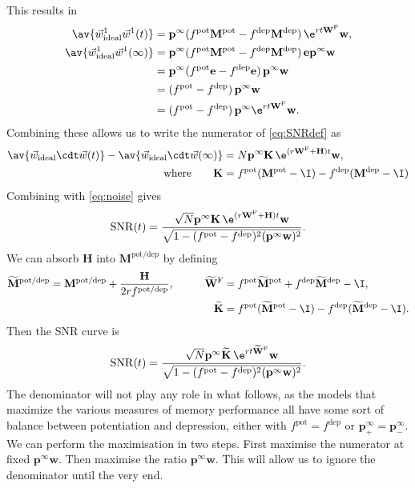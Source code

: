 \documentclass[12pt]{article}
\newcommand{\onev}{\mathbf{e}}
\newcommand{\pr}{\mathbf{p}}
\newcommand{\eq}{\pr^\infty}
\newcommand{\w}{\mathbf{w}}
\newcommand{\W}{\mathbf{W}}
\newcommand{\M}{\mathbf{M}}
\newcommand{\enc}{\mathbf{K}}
\newcommand{\frg}{\W^{\mathrm{F}}}
\newcommand{\pot}{^{\text{pot}}}
\newcommand{\dep}{^{\text{dep}}}
\newcommand{\potdep}{^{\text{pot/dep}}}
\renewcommand{\hom}{\mathbf{H}}
\newcommand{\Mh}{\widetilde{\M}}
\newcommand{\frgh}{\widetilde{\W}^{\mathrm{F}}}
\newcommand{\ench}{\widetilde{\enc}}
\newcommand{\syn}{\vec{w}}
\DeclareMathOperator{\SNR}{SNR}
\begin{document}
This results in
%
\begin{equation}\label{eq:overlapwt}
\begin{aligned}
  \av{\syn^1_\text{ideal}\syn^1(t)} &= \eq (f\pot\M\pot-f\dep\M\dep)\, \e^{rt\frg} \w, \\
  \av{\syn^1_\text{ideal}\syn^1(\infty)} &= \eq (f\pot\M\pot-f\dep\M\dep)\, \onev\eq \w \\
         &= \eq (f\pot\onev-f\dep\onev)\, \eq \w \\
         &=  (f\pot-f\dep)\, \eq \w \\
         &=  (f\pot-f\dep)\, \eq \e^{rt\frg} \w .
\end{aligned}
\end{equation}
%
Combining these allows us to write the numerator of \eqref{eq:SNRdef} as
%
\begin{equation}\label{eq:signal}
\begin{aligned}
  \av{\syn_\text{ideal}\cdt\syn(t)} - \av{\syn_\text{ideal}\cdt\syn(\infty)}
    &= N \eq \enc \, \e^{(r\frg+\hom)t} \w , \\
    \text{where} \qquad
  \enc &= f\pot(\M\pot-\I)-f\dep(\M\dep-\I)
\end{aligned}
\end{equation}
%
Combining with \eqref{eq:noise} gives
%
\begin{equation}\label{eq:SNRcurveExact}
  \SNR(t) = \frac{\sqrt{N} \eq \enc\,\e^{(r\frg+\hom)t}\w}
                 {\sqrt{1-(f\pot-f\dep)^2(\eq\w)^2}}.
\end{equation}
%
We can absorb $\hom$ into $\M\potdep$ by defining
%
\begin{equation}\label{eq:absorbhom}
\begin{aligned}
  \Mh\potdep &= \M\potdep + \frac{\hom}{2rf\potdep},
  &\qquad
  \frgh &= f\pot\Mh\pot + f\dep\Mh\dep - \I,
  \\&&
  \ench &= f\pot(\Mh\pot-\I)-f\dep(\Mh\dep-\I).
\end{aligned}
\end{equation}
%
Then the SNR curve is
%
\begin{equation}\label{eq:SNRcurvehom}
  \SNR(t) = \frac{\sqrt{N}  \eq \ench \,\e^{rt\frgh}\w}
                 {\sqrt{1-(f\pot-f\dep)^2(\eq\w)^2}}.
\end{equation}
%
The denominator will not play any role in what follows, as the models that maximize the various measures of memory performance all have some sort of balance between potentiation and depression, either with $f\pot=f\dep$ or $\eq_+=\eq_-$.
We can perform the maximisation in two steps.
First maximise the numerator at fixed $\eq\w$.
Then maximise the ratio \wrt $\eq\w$.
This will allow us to ignore the denominator until the very end.
\end{document}
